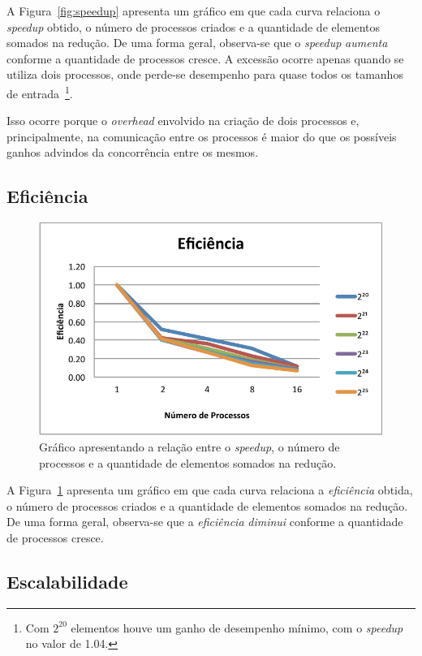 \documentclass[12pt,a4paper]{article}
\begin{document}
A Figura~\ref{fig:speedup} apresenta um gráfico em que cada curva relaciona o
\textit{speedup} obtido, o número de processos criados e a quantidade de
elementos somados na redução. De uma forma geral, observa-se que o
\textit{speedup} \emph{aumenta} conforme a quantidade de processos cresce. A
excessão ocorre apenas quando se utiliza dois processos, onde perde-se
desempenho para quase todos os tamanhos de entrada~\footnote{Com $2^{20}$
elementos houve um ganho de desempenho mínimo, com o \textit{speedup} no valor
de 1.04.}.

Isso ocorre porque o \textit{overhead} envolvido na criação de dois processos e,
principalmente, na comunicação entre os processos é maior do que os possíveis
ganhos advindos da concorrência entre os mesmos.

\subsection{Eficiência}

\begin{figure}[h!]
\centering
\includegraphics{img/efficiency.pdf}
\caption{Gráfico apresentando a relação entre o \textit{speedup}, o número de
processos e a quantidade de elementos somados na redução.}
\label{fig:efficiency}
\end{figure}

A Figura~\ref{fig:efficiency} apresenta um gráfico em que cada curva relaciona a
\textit{eficiência} obtida, o número de processos criados e a quantidade de
elementos somados na redução. De uma forma geral, observa-se que a
\textit{eficiência} \emph{diminui} conforme a quantidade de processos cresce.

\subsection{Escalabilidade}
\end{document}
